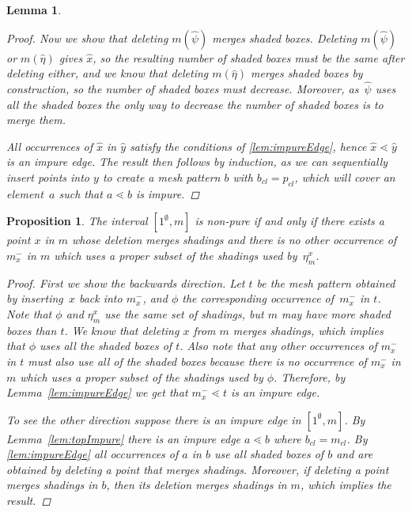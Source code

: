 \documentclass[preprint,11pt]{elsarticle}
\newtheorem{lem}[thm]{Lemma}\crefname{lem}{Lemma}{Lemmas}
\newtheorem{prop}[thm]{Proposition}\crefname{prop}{Proposition}{Propositions}
\newcommand\cl[1]{#1_{cl}}
\newcommand\occX[2]{\eta^{#2}_{#1}}
\newcommand\mX[2]{#1^{-}_{#2}}
\numberwithin{equation}{section}
\numberwithin{figure}{section}
\numberwithin{thm}{section}
\begin{document}
\begin{lem}
\begin{proof}
Now we show that deleting $m(\hat{\psi})$ merges shaded boxes. Deleting $m(\hat{\psi})$ or $m(\hat{\eta})$ gives $\hat{x}$,
 so the resulting number of shaded boxes must be the same after deleting either, and we know that deleting $m(\hat{\eta})$
 merges shaded boxes by construction, so the number of shaded boxes must decrease.
 Moreover, as~$\hat{\psi}$ uses all the shaded boxes the only way to decrease the number of shaded boxes is to merge them. 
 
All occurrences of $\hat{x}$ in $\hat{y}$ satisfy
 the conditions of \cref{lem:impureEdge}, hence $\hat{x}\lessdot\hat{y}$ is an impure edge.
 The result then follows by induction, as we can sequentially insert points into $y$
 to create a mesh pattern $b$ with $\cl{b}=\cl{p}$, which will cover an element~$a$
 such that $a\lessdot b$ is impure.
\end{proof}
\end{lem}

\begin{prop}
The interval $[1^\emptyset,m]$ is non-pure if and
only if there exists a point $x$ in $m$ whose deletion merges shadings and
there is no other occurrence of $\mX{m}{x}$ in $m$ which uses a proper subset of the shadings
used by~$\occX{m}{x}$.
\begin{proof}
First we show the backwards direction. Let $t$  be the mesh pattern obtained by
inserting~$x$ back into $\mX{m}{x}$, and $\phi$ the corresponding occurrence of~$\mX{m}{x}$
in $t$. Note that $\phi$ and $\occX{m}{x}$ use the same set of shadings,
but $m$ may have more shaded boxes than $t$.
We know that deleting $x$ from $m$ merges shadings, which implies that $\phi$ uses all the
shaded boxes of $t$. 
Also note that any other occurrences of $\mX{m}{x}$ in $t$ must also use all of the shaded boxes
because there is no occurrence of $\mX{m}{x}$ in $m$ which uses a proper subset of the shadings
used by $\phi$. Therefore, by Lemma~\ref{lem:impureEdge} we get that
$\mX{m}{x}\lessdot t$ is an impure edge.

To see the other direction suppose there is an impure edge in $[1^{\emptyset},m]$. By
Lemma~\ref{lem:topImpure} there is an impure edge $a\lessdot b$ where
$\cl{b}=\cl{m}$. By \cref{lem:impureEdge} all occurrences of $a$ in
$b$ use all shaded boxes of $b$ and are obtained by deleting a point that merges
shadings. Moreover, if deleting a point merges shadings in $b$, then its deletion merges shadings in $m$,
which implies the result.
\end{proof}
\end{prop}
\end{document}
